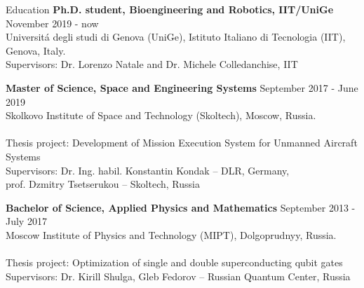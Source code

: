 \documentclass{resume} %
\begin{document}



\begin{rSection}{Education}
{\bf Ph.D. student, Bioengineering and Robotics, IIT/UniGe} \hfill {November 2019 - now}
\\ 
Universit\'a degli studi di Genova (UniGe), Istituto Italiano di Tecnologia (IIT), Genova, Italy.
\\
{Supervisors: Dr. Lorenzo Natale and Dr. Michele Colledanchise, IIT }


{\bf Master of Science, Space and Engineering Systems} \hfill {September 2017 - June 2019}
\\ 
Skolkovo Institute of Space and Technology (Skoltech), Moscow, Russia.
\\
\\
{Thesis project: Development of Mission Execution System for Unmanned Aircraft Systems}
\\
{Supervisors: Dr. Ing. habil. Konstantin Kondak -- DLR, Germany,\\} 
{prof. Dzmitry Tsetserukou -- Skoltech, Russia}

{\bf Bachelor of Science, Applied Physics and Mathematics} \hfill {September 2013 - July 2017}
\\ 
Moscow Institute of Physics and Technology (MIPT), Dolgoprudnyy, Russia.
\\
\\
Thesis project: Optimization of single and double superconducting qubit gates 
\\
Supervisors: Dr. Kirill Shulga, Gleb Fedorov -- Russian Quantum Center, Russia



\end{rSection}
\end{document}
